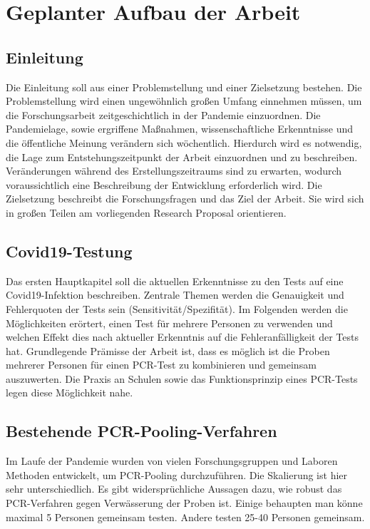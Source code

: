 
\chapter{Geplanter Aufbau der Arbeit}
\section{Einleitung}
Die Einleitung soll aus einer Problemstellung und einer Zielsetzung bestehen.
Die Problemstellung wird einen ungewöhnlich großen Umfang einnehmen müssen, um die Forschungsarbeit zeitgeschichtlich in der Pandemie einzuordnen.
Die Pandemielage, sowie ergriffene Maßnahmen, wissenschaftliche Erkenntnisse und die öffentliche Meinung verändern sich wöchentlich.
Hierdurch wird es notwendig, die Lage zum Entstehungszeitpunkt der Arbeit einzuordnen und zu beschreiben.
Veränderungen während des Erstellungszeitraums sind zu erwarten, wodurch voraussichtlich eine Beschreibung der Entwicklung erforderlich wird.
Die Zielsetzung beschreibt die Forschungsfragen und das Ziel der Arbeit.
Sie wird sich in großen Teilen am vorliegenden Research Proposal orientieren.

\section{Covid19-Testung}
Das ersten Hauptkapitel soll die aktuellen Erkenntnisse zu den Tests auf eine Covid19-Infektion beschreiben.
Zentrale Themen werden die Genauigkeit und Fehlerquoten der Tests sein (Sensitivität/Spezifität).
Im Folgenden werden die Möglichkeiten erörtert, einen Test für mehrere Personen zu verwenden und welchen Effekt dies nach aktueller Erkenntnis auf die Fehleranfälligkeit der Tests hat.
Grundlegende Prämisse der Arbeit ist, dass es möglich ist die Proben mehrerer Personen für einen PCR-Test zu kombinieren und gemeinsam auszuwerten.
Die Praxis an Schulen sowie das Funktionsprinzip eines PCR-Tests legen diese Möglichkeit nahe.

\section{Bestehende PCR-Pooling-Verfahren}
Im Laufe der Pandemie wurden von vielen Forschungsgruppen und Laboren Methoden entwickelt, um PCR-Pooling durchzuführen.
Die Skalierung ist hier sehr unterschiedlich.
Es gibt widersprüchliche Aussagen dazu, wie robust das PCR-Verfahren gegen Verwässerung der Proben ist.
Einige behaupten man könne maximal 5 Personen gemeinsam testen. \cite{Quelle}
Andere testen 25-40 Personen gemeinsam. \cite{Quelle}

